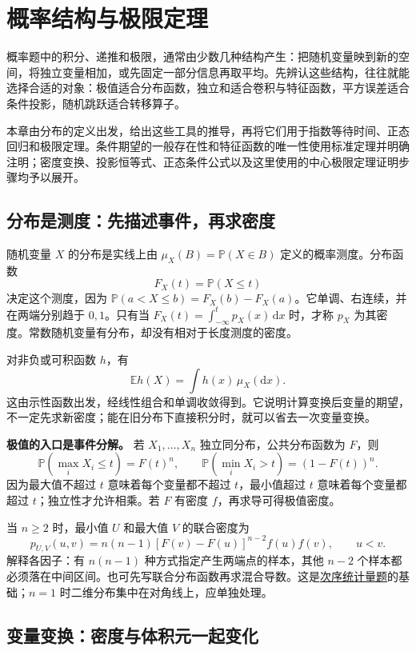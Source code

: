 \documentclass[UTF8,12pt,a4paper,fontset=fandol]{ctexbook}
\begin{document}
\section{概率结构与极限定理}

概率题中的积分、递推和极限，通常由少数几种结构产生：把随机变量映到新的空间，将独立变量相加，或先固定一部分信息再取平均。先辨认这些结构，往往就能选择合适的对象：极值适合分布函数，独立和适合卷积与特征函数，平方误差适合条件投影，随机跳跃适合转移算子。

本章由分布的定义出发，给出这些工具的推导，再将它们用于指数等待时间、正态回归和极限定理。条件期望的一般存在性和特征函数的唯一性使用标准定理并明确注明；密度变换、投影恒等式、正态条件公式以及这里使用的中心极限定理证明步骤均予以展开。

\subsection{分布是测度：先描述事件，再求密度}

\label{app:probability-law}

随机变量 $X$ 的分布是实线上由 $\mu_X(B)=\mathbb P(X\in B)$ 定义的概率测度。分布函数
\[
F_X(t)=\mathbb P(X\le t)
\]
决定这个测度，因为 $\mathbb P(a<X\le b)=F_X(b)-F_X(a)$。它单调、右连续，并在两端分别趋于 $0,1$。只有当 $F_X(t)=\int_{-\infty}^tp_X(x)\,\mathrm dx$ 时，才称 $p_X$ 为其密度。常数随机变量有分布，却没有相对于长度测度的密度。

对非负或可积函数 $h$，有
\[
\mathbb Eh(X)=\int h(x)\,\mu_X(\mathrm dx).
\]
这由示性函数出发，经线性组合和单调收敛得到。它说明计算变换后变量的期望，不一定先求新密度；能在旧分布下直接积分时，就可以省去一次变量变换。

\textbf{极值的入口是事件分解。} 若 $X_1,\ldots,X_n$ 独立同分布，公共分布函数为 $F$，则
\[
\mathbb P\!\left(\max_iX_i\le t\right)=F(t)^n,
\qquad
\mathbb P\!\left(\min_iX_i>t\right)=(1-F(t))^n.
\]
因为最大值不超过 $t$ 意味着每个变量都不超过 $t$，最小值超过 $t$ 意味着每个变量都超过 $t$；独立性才允许相乘。若 $F$ 有密度 $f$，再求导可得极值密度。

当 $n\ge2$ 时，最小值 $U$ 和最大值 $V$ 的联合密度为
\[
p_{U,V}(u,v)=n(n-1)[F(v)-F(u)]^{n-2}f(u)f(v),\qquad u<v.
\]
解释各因子：有 $n(n-1)$ 种方式指定产生两端点的样本，其他 $n-2$ 个样本都必须落在中间区间。也可先写联合分布函数再求混合导数。这是\hyperref[pr:fin09-hi:13]{次序统计量题}的基础；$n=1$ 时二维分布集中在对角线上，应单独处理。

\subsection{变量变换：密度与体积元一起变化}
\end{document}
